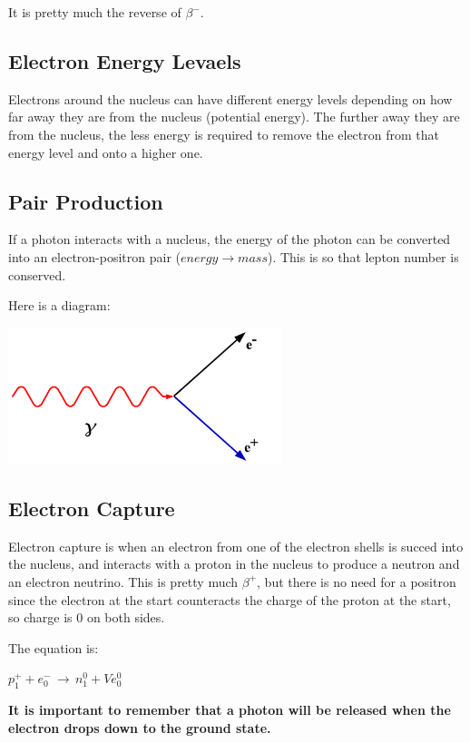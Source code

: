 \documentclass[a4paper, 12pt]{article}
\begin{document}
It is pretty much the reverse of $\beta^-$.

\subsection{Electron Energy Levaels}

Electrons around the nucleus can have different energy levels depending on how far away they are from the nucleus (potential energy). The further away they are from the nucleus, the less energy is required to remove the electron from that energy level and onto a higher one.

\subsection{Pair Production}

If a photon interacts with a nucleus, the energy of the photon can be converted into an electron-positron pair ($energy \rightarrow mass$). This is so that lepton number is conserved.

Here is a diagram:

\begin{center}
\includegraphics[height=4cm]{images/pairProduction.png}
\end{center}

\subsection{Electron Capture}

Electron capture is when an electron from one of the electron shells is succed into the nucleus, and interacts with a proton in the nucleus to produce a neutron and an electron neutrino. This is pretty much $\beta^+$, but there is no need for a positron since the electron at the start counteracts the charge of the proton at the start, so charge is 0 on both sides.

The equation is:

$p^+_1 + e^-_0 \, \rightarrow \, n^0_1 + Ve^0_0$

\textbf{It is important to remember that a photon will be released when the electron drops down to the ground state.}
\end{document}
